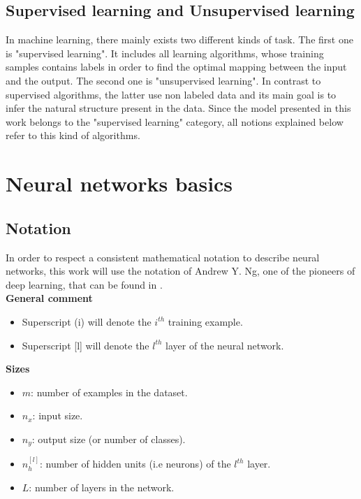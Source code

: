 \subsection{Supervised learning and Unsupervised learning}
In machine learning, there mainly exists two different kinds of task. The first one is "supervised learning". It includes all learning algorithms, whose training samples contains labels in order to find the optimal mapping between the input and the output.  The second one is "unsupervised learning". In contrast to supervised algorithms, the latter use non labeled data and its main goal is to infer the natural structure  present in the data. Since the model presented in this work belongs to the "supervised learning" category, all notions explained below refer to this kind of algorithms.





\section{Neural networks basics}

\subsection{Notation}
In order to respect a consistent mathematical notation to describe neural networks, this work will use the notation of Andrew Y. Ng, one of the pioneers of deep learning, that can be found in \cite{16}.\\

\noindent \textbf{General comment}
\begin{itemize}
\item Superscript (i) will denote the $i^{th}$ training example.
\item Superscript [l] will denote the $l^{th}$ layer of the neural network.
\end{itemize}

\noindent \textbf{Sizes}
\begin{itemize}
\item $m$: number of examples in the dataset.
\item $n_{x}$: input size.
\item $n_{y}$: output size (or number of classes).
\item $n_{h}^{[l]}$: number of hidden units (i.e neurons) of the $l^{th}$ layer. 
\item $L$: number of layers in the network.
\end{itemize}

